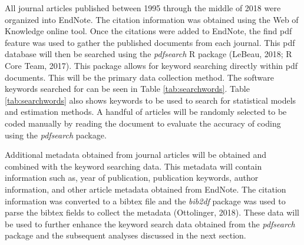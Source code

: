 \documentclass[english,,man]{apa6}
\theoremstyle{definition}
\theoremstyle{definition}
\theoremstyle{definition}
\theoremstyle{remark}
\begin{document}
All journal articles published between 1995 through the middle of 2018
were organized into EndNote. The citation information was obtained using
the Web of Knowledge online tool. Once the citations were added to
EndNote, the find pdf feature was used to gather the published documents
from each journal. This pdf database will then be searched using the
\emph{pdfsearch} R package (LeBeau, 2018; R Core Team, 2017). This
package allows for keyword searching directly within pdf documents. This
will be the primary data collection method. The software keywords
searched for can be seen in Table \ref{tab:searchwords}. Table
\ref{tab:searchwords} also shows keywords to be used to search for
statistical models and estimation methods. A handful of articles will be
randomly selected to be coded manually by reading the document to
evaluate the accuracy of coding using the \emph{pdfsearch} package.

Additional metadata obtained from journal articles will be obtained and
combined with the keyword searching data. This metadata will contain
information such as, year of publication, publication keywords, author
information, and other article metadata obtained from EndNote. The
citation information was converted to a bibtex file and the
\emph{bib2df} package was used to parse the bibtex fields to collect the
metadata (Ottolinger, 2018). These data will be used to further enhance
the keyword search data obtained from the \emph{pdfsearch} package and
the subsequent analyses discussed in the next section.
\end{document}
